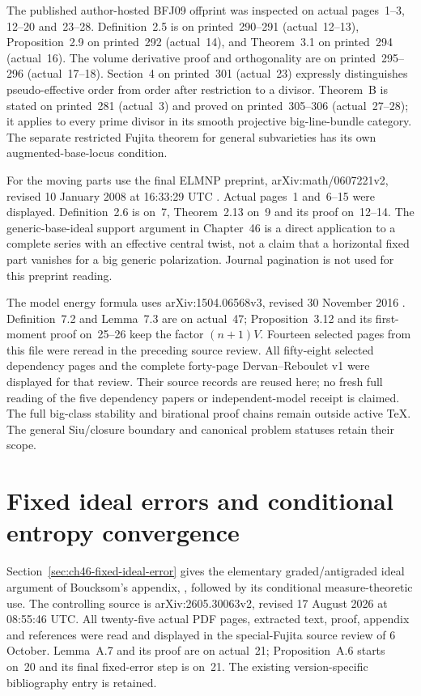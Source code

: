 The published author-hosted BFJ09 offprint was inspected on actual
pages~1--3, 12--20 and~23--28. Definition~2.5 is on printed~290--291
(actual~12--13), Proposition~2.9 on printed~292 (actual~14), and
Theorem~3.1 on printed~294 (actual~16). The volume derivative proof
and orthogonality are on printed~295--296 (actual~17--18).
Section~4 on printed~301 (actual~23) expressly distinguishes
pseudo-effective order from order after restriction to a divisor.
Theorem~B is stated on printed~281 (actual~3) and proved on
printed~305--306 (actual~27--28); it applies to every prime divisor
in its smooth projective big-line-bundle category. The separate
restricted Fujita theorem for general subvarieties has its own
augmented-base-locus condition.

For the moving parts use the final ELMNP preprint,
arXiv:math/0607221v2, revised 10 January 2008 at 16:33:29 UTC
\cite{ELMNP08RestrictedV2}. Actual pages~1 and~6--15 were displayed.
Definition~2.6 is on~7, Theorem~2.13 on~9 and its proof on~12--14.
The generic-base-ideal support argument in Chapter~46 is a direct
application to a complete series with an effective central twist,
not a claim that a horizontal fixed part vanishes for a big generic
polarization. Journal pagination is not used for this preprint reading.

The model energy formula uses arXiv:1504.06568v3, revised
30 November 2016 \cite{BHJ16UniformV3}. Definition~7.2 and
Lemma~7.3 are on actual~47; Proposition~3.12 and its first-moment
proof on~25--26 keep the factor $(n+1)V$.
Fourteen selected pages from this file were reread in the preceding
source review. All fifty-eight selected dependency pages and the
complete forty-page Dervan--Reboulet v1 were displayed for that
review. Their source records are reused here; no fresh full reading
of the five dependency papers or independent-model receipt is claimed.
The full big-class stability and birational proof chains remain
outside active TeX. The general Siu/closure boundary and canonical
problem statuses retain their scope.

\section{Fixed ideal errors and conditional entropy convergence}
\label{sec:provenance-fixed-ideal-error}

Section~\ref{sec:ch46-fixed-ideal-error} gives the elementary
graded/antigraded ideal argument of Boucksom's appendix,
\cite[Lemma~A.7]{Trusiani26}, followed by its conditional
measure-theoretic use. The controlling source is
arXiv:2605.30063v2, revised 17 August 2026 at 08:55:46 UTC.
All twenty-five actual PDF pages, extracted text, proof, appendix
and references were read and displayed in the special-Fujita source
review of 6 October. Lemma~A.7 and its proof are on actual~21;
Proposition~A.6 starts on~20 and its final fixed-error step is on~21.
The existing version-specific bibliography entry is retained.

